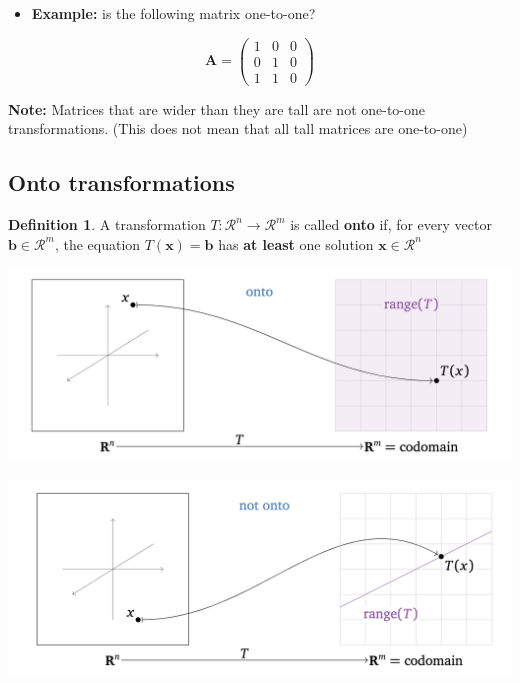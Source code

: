 \documentclass[
]{book}
\providecommand{\tightlist}{%
  \setlength{\itemsep}{0pt}\setlength{\parskip}{0pt}}
\theoremstyle{definition}
\newtheorem{definition}{Definition}[chapter]
\theoremstyle{definition}
\theoremstyle{definition}
\theoremstyle{remark}
\begin{document}
\begin{itemize}
\tightlist
\item
  \textbf{Example:} is the following matrix one-to-one?
\end{itemize}

\[
\mathbf{A} = \begin{pmatrix}
1 & 0 & 0 \\
0 & 1 & 0 \\
1 & 1 & 0
\end{pmatrix}
\]

\textbf{Note:} Matrices that are wider than they are tall are not one-to-one transformations. (This does not mean that all tall matrices are one-to-one)

\hypertarget{onto-transformations}{%
\subsection{Onto transformations}\label{onto-transformations}}

\begin{definition}
\protect\hypertarget{def:unnamed-chunk-122}{}{\label{def:unnamed-chunk-122} }A transformation \(T:\mathcal{R}^n \rightarrow \mathcal{R}^m\) is called \textbf{onto} if, for every vector \(\mathbf{b} \in \mathcal{R}^m\), the equation \(T(\mathbf{x}) = \mathbf{b}\) has \textbf{at least} one solution \(\mathbf{x} \in \mathcal{R}^n\)
\end{definition}

\includegraphics[width=18.44in]{images/onto}

\includegraphics[width=18.47in]{images/not-onto}
\end{document}
